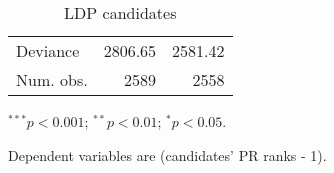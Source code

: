 \begin{table}[htbp]
{\begin{threeparttable}
\begin{tabular}{l D{.}{.}{5.5} D{.}{.}{5.5}}
Deviance              & 2806.65                 & 2581.42                 \\
Num. obs.             & 2589                    & 2558                    \\
\bottomrule
\end{tabular}
\begin{tablenotes}[flushleft]
\scriptsize{
\item $^{***}p<0.001$; $^{**}p<0.01$; $^{*}p<0.05$.
\item Dependent variables are (candidates' PR ranks - 1).}
\end{tablenotes}
\end{threeparttable}
}
\caption{LDP candidates}
\label{table:coefCountLDP}
\end{table}

